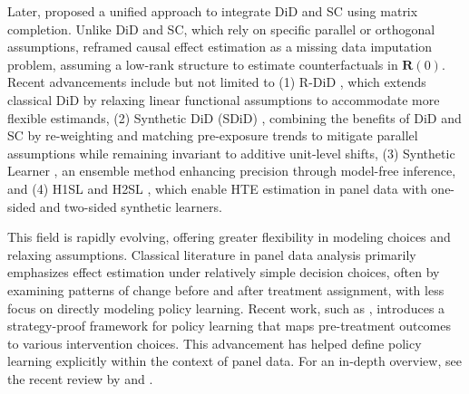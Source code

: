 Later, \citet{athey2021matrix} proposed a unified approach to integrate \acrshort{DiD} and \acrshort{SC} using matrix completion. Unlike \acrshort{DiD} and \acrshort{SC}, which rely on specific parallel or orthogonal assumptions, \citet{athey2021matrix} reframed causal effect estimation as a missing data imputation problem, assuming a low-rank structure to estimate counterfactuals in $\boldsymbol{R}(0)$. Recent advancements include but not limited to (1) R-DiD \citep{nie2019nonparametric}, which extends classical DiD by relaxing linear functional assumptions to accommodate more flexible estimands, (2) Synthetic DiD (SDiD) \citep{arkhangelsky2021synthetic}, combining the benefits of DiD and SC by re-weighting and matching pre-exposure trends to mitigate parallel assumptions while remaining invariant to additive unit-level shifts, (3) Synthetic Learner \citep{viviano2023synthetic}, an ensemble method enhancing precision through model-free inference, and (4) H1SL and H2SL \citet{shen2022heterogeneous}, which enable  \acrshort{HTE} estimation in panel data with one-sided and two-sided synthetic learners.

This field is rapidly evolving, offering greater flexibility in modeling choices and relaxing assumptions. 
Classical literature in panel data analysis primarily emphasizes effect estimation under relatively simple decision choices, often by examining patterns of change before and after treatment assignment, with less focus on directly modeling policy learning. Recent work, such as \citet{harris2024strategyproof}, introduces a strategy-proof framework for policy learning that maps pre-treatment outcomes to various intervention choices. This advancement has helped define policy learning explicitly within the context of panel data. For an in-depth overview, see the recent review by \citet{hsiao2022analysis} and \citet{arkhangelsky2023causal}.


